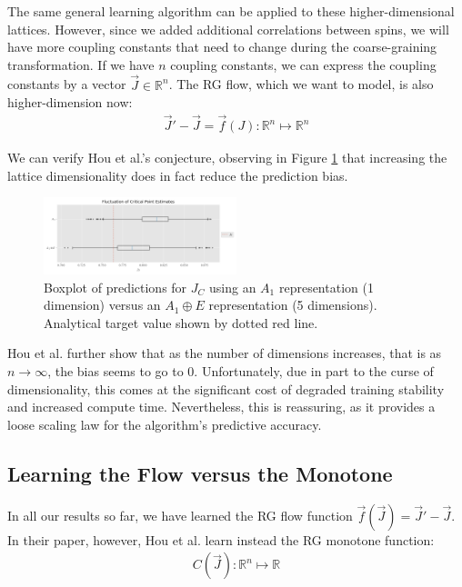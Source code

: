\documentclass[%
    reprint,
    amsmath,amssymb,
    aps,
]{revtex4-2}
\begin{document}
The same general learning algorithm can be applied to these higher-dimensional lattices. 
However, since we added additional correlations between spins, we will have more coupling constants that need to change during the coarse-graining transformation. 
If we have $n$ coupling constants, we can express the coupling constants by a vector $\vec{J} \in \mathbb{R}^n$. 
The RG flow, which we want to model, is also higher-dimension now:
\begin{eqnarray}
    \label{eqn:nd-flow}
    \vec{J}' - \vec{J} = \vec{f}(J) : \mathbb{R}^n \mapsto \mathbb{R}^n
\end{eqnarray}

We can verify Hou et al.'s conjecture, observing in Figure \ref{fig:a1-a1e-boxplot} that increasing the lattice dimensionality does in fact reduce the prediction bias. 

\begin{figure}[h]
    \includegraphics[width=0.5\textwidth]{tex/images/a1-a1e-critical-points-boxplot.png}
    \caption{\label{fig:a1-a1e-boxplot}
        Boxplot of predictions for $J_C$ using an $A_1$ representation (1 dimension) versus an $A_1 \oplus E$ representation (5 dimensions). 
        Analytical target value shown by dotted red line. 
    }
\end{figure}

Hou et al. \cite{mlrg} further show that as the number of dimensions increases, that is as $n \rightarrow \infty$, the bias seems to go to $0$. 
Unfortunately, due in part to the curse of dimensionality, this comes at the significant cost of degraded training stability and increased compute time. 
Nevertheless, this is reassuring, as it provides a loose scaling law for the algorithm's predictive accuracy. 

\subsection{Learning the Flow versus the Monotone}

In all our results so far, we have learned the RG flow function $\vec{f}(\vec{J}) = \vec{J}' - \vec{J}$. 
In their paper, however, Hou et al. learn instead the RG monotone function:
\begin{eqnarray}
    \label{eqn:rg-monotone}
    C(\vec{J}) : \mathbb{R}^n \mapsto \mathbb{R}
\end{eqnarray}
\end{document}
